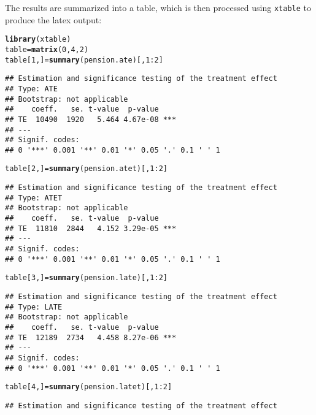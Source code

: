 \documentclass{amsart}\usepackage[]{graphicx}\usepackage[]{color}
\makeatletter
\newcommand{\hlnum}[1]{\textcolor[rgb]{0.686,0.059,0.569}{#1}}%
\newcommand{\hlopt}[1]{\textcolor[rgb]{0,0,0}{#1}}%
\newcommand{\hlstd}[1]{\textcolor[rgb]{0.345,0.345,0.345}{#1}}%
\newcommand{\hlkwb}[1]{\textcolor[rgb]{0.69,0.353,0.396}{#1}}%
\newcommand{\hlkwd}[1]{\textcolor[rgb]{0.737,0.353,0.396}{\textbf{#1}}}%
\newenvironment{kframe}{%
 \def\at@end@of@kframe{}%
 \ifinner\ifhmode%
  \def\at@end@of@kframe{\end{minipage}}%
  \begin{minipage}{\columnwidth}%
 \fi\fi%
 \def\FrameCommand##1{\hskip\@totalleftmargin \hskip-\fboxsep
 \colorbox{shadecolor}{##1}\hskip-\fboxsep
     \hskip-\linewidth \hskip-\@totalleftmargin \hskip\columnwidth}%
 \MakeFramed {\advance\hsize-\width
   \@totalleftmargin\z@ \linewidth\hsize
   \@setminipage}}%
 {\par\unskip\endMakeFramed%
 \at@end@of@kframe}
\newenvironment{knitrout}{}{} %
\newcommand{\code}[1]{\texttt{#1}}
\makeatother
\begin{document}
The results are summarized into a table, which is then
processed using \code{xtable} to produce the latex output:

\begin{knitrout}
\color{fgcolor}\begin{kframe}
\begin{alltt}
\hlkwd{library}\hlstd{(xtable)}
\hlstd{table} \hlkwb{=} \hlkwd{matrix}\hlstd{(}\hlnum{0}\hlstd{,} \hlnum{4}\hlstd{,} \hlnum{2}\hlstd{)}
\hlstd{table[}\hlnum{1}\hlstd{, ]} \hlkwb{=} \hlkwd{summary}\hlstd{(pension.ate)[,} \hlnum{1}\hlopt{:}\hlnum{2}\hlstd{]}
\end{alltt}
\begin{verbatim}
## Estimation and significance testing of the treatment effect 
## Type: ATE 
## Bootstrap: not applicable 
##    coeff.   se. t-value  p-value    
## TE  10490  1920   5.464 4.67e-08 ***
## ---
## Signif. codes:  
## 0 '***' 0.001 '**' 0.01 '*' 0.05 '.' 0.1 ' ' 1
\end{verbatim}
\begin{alltt}
\hlstd{table[}\hlnum{2}\hlstd{, ]} \hlkwb{=} \hlkwd{summary}\hlstd{(pension.atet)[,} \hlnum{1}\hlopt{:}\hlnum{2}\hlstd{]}
\end{alltt}
\begin{verbatim}
## Estimation and significance testing of the treatment effect 
## Type: ATET 
## Bootstrap: not applicable 
##    coeff.   se. t-value  p-value    
## TE  11810  2844   4.152 3.29e-05 ***
## ---
## Signif. codes:  
## 0 '***' 0.001 '**' 0.01 '*' 0.05 '.' 0.1 ' ' 1
\end{verbatim}
\begin{alltt}
\hlstd{table[}\hlnum{3}\hlstd{, ]} \hlkwb{=} \hlkwd{summary}\hlstd{(pension.late)[,} \hlnum{1}\hlopt{:}\hlnum{2}\hlstd{]}
\end{alltt}
\begin{verbatim}
## Estimation and significance testing of the treatment effect 
## Type: LATE 
## Bootstrap: not applicable 
##    coeff.   se. t-value  p-value    
## TE  12189  2734   4.458 8.27e-06 ***
## ---
## Signif. codes:  
## 0 '***' 0.001 '**' 0.01 '*' 0.05 '.' 0.1 ' ' 1
\end{verbatim}
\begin{alltt}
\hlstd{table[}\hlnum{4}\hlstd{, ]} \hlkwb{=} \hlkwd{summary}\hlstd{(pension.latet)[,} \hlnum{1}\hlopt{:}\hlnum{2}\hlstd{]}
\end{alltt}
\begin{verbatim}
## Estimation and significance testing of the treatment effect 

\end{verbatim}
\end{kframe}
\end{knitrout}
\end{document}

